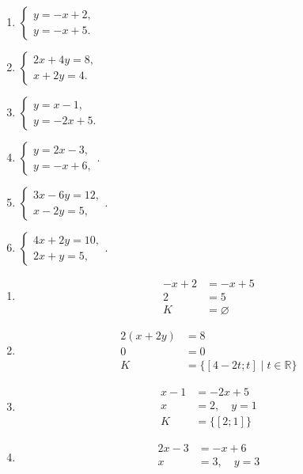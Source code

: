 \documentclass[11pt,a4paper]{article}
\begin{document}
\begin{zadaniReseniBox}[title={Domácí úkol}]
\begin{enumerate}[label=\alph*)]
\item
$\begin{cases}y=-x+2,\\y=-x+5.\end{cases}$
\item
$\begin{cases}2x+4y=8,\\x+2y=4.\end{cases}$
\item
$\begin{cases}y=x-1,\\y=-2x+5.\end{cases}$
\item
$\begin{cases}y=2x-3,\\y=-x+6,\end{cases}$.
\item
$\begin{cases}3x-6y=12,\\x-2y=5,\end{cases}$.
\item
$\begin{cases}4x+2y=10,\\2x+y=5,\end{cases}$.
\end{enumerate}
\tcblower
\begin{enumerate}[label=\alph*)]
\item
\[
\begin{aligned}
-x+2&=-x+5 \\
 2&=5 \\[2mm]
K &= \varnothing
\end{aligned}
\]
\item
\[
\begin{aligned}
2(x+2y)&=8 \\
 0&=0 \\[2mm]
K &= \{[4-2t;t]\mid t\in\mathbb R\}
\end{aligned}
\]
\item
\[
\begin{aligned}
x-1&=-2x+5 \\
 x&=2,\quad y=1 \\[2mm]
K &= \{[2;1]\}
\end{aligned}
\]
\item
\[
\begin{aligned}
2x-3&=-x+6\\x&=3,\quad y=3 \\[2mm]

\end{aligned}\]
\end{enumerate}
\end{zadaniReseniBox}
\end{document}
